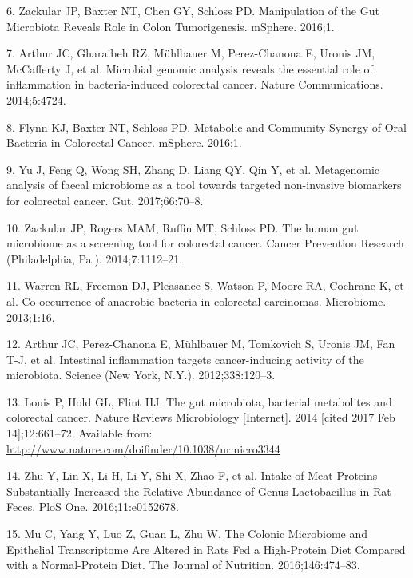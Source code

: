 \documentclass[12pt,]{article}
\begin{document}
\hypertarget{ref-zackular_manipulation_2016}{}
6. Zackular JP, Baxter NT, Chen GY, Schloss PD. Manipulation of the Gut
Microbiota Reveals Role in Colon Tumorigenesis. mSphere. 2016;1.

\hypertarget{ref-arthur_microbial_2014}{}
7. Arthur JC, Gharaibeh RZ, Mühlbauer M, Perez-Chanona E, Uronis JM,
McCafferty J, et al. Microbial genomic analysis reveals the essential
role of inflammation in bacteria-induced colorectal cancer. Nature
Communications. 2014;5:4724.

\hypertarget{ref-flynn_metabolic_2016}{}
8. Flynn KJ, Baxter NT, Schloss PD. Metabolic and Community Synergy of
Oral Bacteria in Colorectal Cancer. mSphere. 2016;1.

\hypertarget{ref-yu_metagenomic_2017}{}
9. Yu J, Feng Q, Wong SH, Zhang D, Liang QY, Qin Y, et al. Metagenomic
analysis of faecal microbiome as a tool towards targeted non-invasive
biomarkers for colorectal cancer. Gut. 2017;66:70--8.

\hypertarget{ref-zackular_human_2014}{}
10. Zackular JP, Rogers MAM, Ruffin MT, Schloss PD. The human gut
microbiome as a screening tool for colorectal cancer. Cancer Prevention
Research (Philadelphia, Pa.). 2014;7:1112--21.

\hypertarget{ref-warren_co-occurrence_2013}{}
11. Warren RL, Freeman DJ, Pleasance S, Watson P, Moore RA, Cochrane K,
et al. Co-occurrence of anaerobic bacteria in colorectal carcinomas.
Microbiome. 2013;1:16.

\hypertarget{ref-arthur_intestinal_2012}{}
12. Arthur JC, Perez-Chanona E, Mühlbauer M, Tomkovich S, Uronis JM, Fan
T-J, et al. Intestinal inflammation targets cancer-inducing activity of
the microbiota. Science (New York, N.Y.). 2012;338:120--3.

\hypertarget{ref-louis_gut_2014}{}
13. Louis P, Hold GL, Flint HJ. The gut microbiota, bacterial
metabolites and colorectal cancer. Nature Reviews Microbiology
{[}Internet{]}. 2014 {[}cited 2017 Feb 14{]};12:661--72. Available from:
\url{http://www.nature.com/doifinder/10.1038/nrmicro3344}

\hypertarget{ref-zhu_intake_2016}{}
14. Zhu Y, Lin X, Li H, Li Y, Shi X, Zhao F, et al. Intake of Meat
Proteins Substantially Increased the Relative Abundance of Genus
Lactobacillus in Rat Feces. PloS One. 2016;11:e0152678.

\hypertarget{ref-mu_colonic_2016}{}
15. Mu C, Yang Y, Luo Z, Guan L, Zhu W. The Colonic Microbiome and
Epithelial Transcriptome Are Altered in Rats Fed a High-Protein Diet
Compared with a Normal-Protein Diet. The Journal of Nutrition.
2016;146:474--83.
\end{document}
